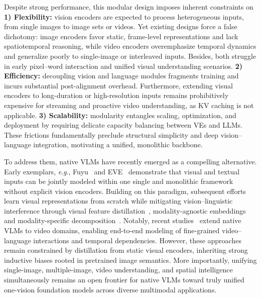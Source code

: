 \documentclass[11pt]{article}
\newcommand{\eg}{\textit{e}.\textit{g}.}
\begin{document}
Despite strong performance, this modular design imposes inherent constraints on 
%
\textbf{1) Flexibility:}
vision encoders are expected to process heterogeneous inputs, from single images to image sets or videos. Yet existing designs force a false dichotomy: image encoders favor static, frame-level representations and lack spatiotemporal reasoning, while video encoders overemphasize temporal dynamics and generalize poorly to single-image or interleaved inputs. Besides, both struggle in early pixel–word interaction and unified visual understanding scenarios.
%
\textbf{2) Efficiency:}
decoupling vision and language modules fragments training and incurs substantial post-alignment overhead. Furthermore, extending visual encoders to long-duration or high-resolution inputs remains prohibitively expensive for streaming and proactive video understanding, as KV caching is not applicable.
%
\textbf{3) Scalability:}
modularity entangles scaling, optimization, and deployment by requiring delicate capacity balancing between VEs and LLMs. These frictions fundamentally preclude structural simplicity and deep vision–language integration, motivating a unified, monolithic backbone.


To address them, native VLMs have recently emerged as a compelling alternative. Early exemplars, \eg, Fuyu~\cite{VLM:Fuyu-8b} and EVE~\cite{VLM:EVE} demonstrate that visual and textual inputs can be jointly modeled within one single and monolithic framework without explicit vision encoders. Building on this paradigm, subsequent efforts learn visual representations from scratch while mitigating vision–linguistic interference through visual feature distillation~\cite{VLM:EVE,VLM:BREEN,VLM:VoRA}, modality-agnostic embeddings~\cite{VLM:NEO,VLM:HoVLE,VLM:HaploVL} and modality-specific decomposition~\cite{VLM:EVEv2,VLM:Mono-InternVL,VLM:Mono-InternVL-1.5}.
%
Notably, recent studies~\cite{VLM:Video-Panda,VLM:ELVA} extend native VLMs to video domains, enabling end-to-end modeling of fine-grained video–language interactions and temporal dependencies. However, these approaches remain constrained by distillation from static visual encoders, inheriting strong inductive biases rooted in pretrained image semantics. 
More importantly, unifying single-image, multiple-image, video understanding, and spatial intelligence simultaneously remains an open frontier for native VLMs toward truly unified one-vision foundation models across diverse multimodal applications.
\end{document}
